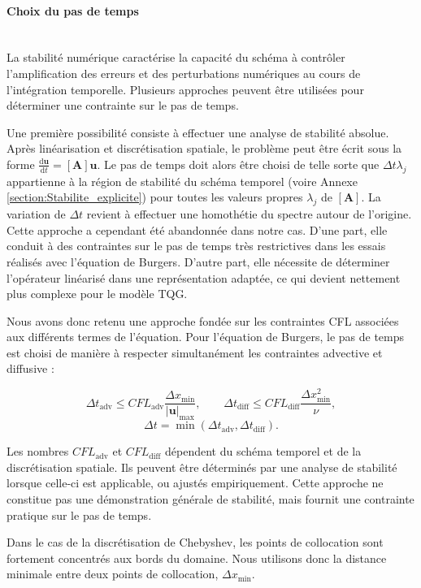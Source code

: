 \paragraph{Choix du pas de temps}~\\

La stabilité numérique caractérise la capacité du schéma à contrôler l'amplification des erreurs et des perturbations numériques au cours de l'intégration temporelle. Plusieurs approches peuvent être utilisées pour déterminer une contrainte sur le pas de temps.

Une première possibilité consiste à effectuer une analyse de stabilité absolue. Après linéarisation et discrétisation spatiale, le problème peut être écrit sous la forme $\frac{\mathrm{d}\mathbf{u}}{\mathrm{d}t}=[\mathbf{A}]\mathbf{u}$. Le pas de temps doit alors être choisi de telle sorte que $\Delta t\lambda_j$ appartienne à la région de stabilité du schéma temporel (voire Annexe \ref{section:Stabilite_explicite}) pour toutes les valeurs propres $\lambda_j$ de $[\mathbf{A}]$. La variation de $\Delta t$ revient à effectuer une homothétie du spectre autour de l'origine. Cette approche a cependant été abandonnée dans notre cas. D'une part, elle conduit à des contraintes sur le pas de temps très restrictives dans les essais réalisés avec l'équation de Burgers. D'autre part, elle nécessite de déterminer l'opérateur linéarisé dans une représentation adaptée, ce qui devient nettement plus complexe pour le modèle TQG.

Nous avons donc retenu une approche fondée sur les contraintes CFL associées aux différents termes de l'équation. Pour l'équation de Burgers, le pas de temps est choisi de manière à respecter simultanément les contraintes advective et diffusive :

$$ \Delta t_{\mathrm{adv}}\leq CFL_{\mathrm{adv}} \frac{\Delta x_{\min}}{|\mathbf{u}|_{\max}}, \qquad \Delta t_{\mathrm{diff}}\leq CFL_{\mathrm{diff}} \frac{\Delta x_{\min}^2}{\nu}, $$ $$ \Delta t=\min(\Delta t_{\mathrm{adv}},\Delta t_{\mathrm{diff}}). $$

Les nombres $CFL_{\mathrm{adv}}$ et $CFL_{\mathrm{diff}}$ dépendent du schéma temporel et de la discrétisation spatiale. Ils peuvent être déterminés par une analyse de stabilité lorsque celle-ci est applicable, ou ajustés empiriquement. Cette approche ne constitue pas une démonstration générale de stabilité, mais fournit une contrainte pratique sur le pas de temps.

Dans le cas de la discrétisation de Chebyshev, les points de collocation sont fortement concentrés aux bords du domaine. Nous utilisons donc la distance minimale entre deux points de collocation, $\Delta x_{\min}$.



